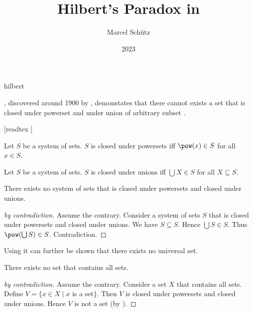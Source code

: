 \documentclass{stex}
\begin{document}
\title{Hilbert's Paradox in \Naproche}
\author{Marcel Schütz}
\date{2023}
\maketitle
\begin{smodule}{hilbert}
\begin{sparagraph}
  \emph{}, discovered around 1900 by , demonstates that there cannot exists a set that is closed under powerset and under union of arbitrary subset \cite{PeckhausKahl2002}.
\end{sparagraph}

\begin{forthel}
  [readtex ]

  \begin{definition*}
    Let $S$ be a system of sets.
    $S$ is closed under powersets iff $\pow(x) \in S$ for all $x \in S$.
  \end{definition*}

  \begin{definition*}
    Let $S$ be a system of sets.
    $S$ is closed under unions iff $\bigcup X \in S$ for all $X \subseteq S$.
  \end{definition*}

  \begin{theorem*}\label{hilbert_paradox}
    There exists no system of sets that is closed under powersets and closed under unions.
  \end{theorem*}
  \begin{proof}[ by contradiction]
    Assume the contrary.
    Consider a system of sets $S$ that is closed under powersets and closed under unions.
    We have $S \subseteq S$.
    Hence $\bigcup S \in S$.
    Thus $\pow(\bigcup S) \in S$.
    Contradiction.
  \end{proof}
\end{forthel}

\begin{sparagraph}
  Using  it can further be shown that there exists no universal set.
\end{sparagraph}

\begin{forthel}
  \begin{corollary*}
    There exists no set that contains all sets.
  \end{corollary*}
  \begin{proof}[ by contradiction]
    Assume the contrary.
    Consider a set $X$ that contains all sets.
    Define $V = \{ x \in X \mid x$ is a set$\}$.
    Then $V$ is closed under powersets and closed under unions.
    Hence $V$ is not a set (by ).
  \end{proof}
\end{forthel}
\end{smodule}
\printbibliography
\end{document}
